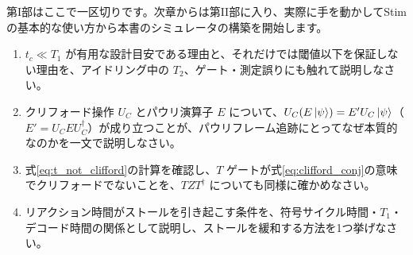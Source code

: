 第I部はここで一区切りです。次章からは第II部に入り、実際に手を動かしてStimの基本的な使い方から本書のシミュレータの構築を開始します。

\begin{exercise}
  \begin{enumerate}
    \item $t_c\ll T_1$ が有用な設計目安である理由と、それだけでは閾値以下を保証しない理由を、アイドリング中の $T_2$、ゲート・測定誤りにも触れて説明しなさい。
    \item クリフォード操作 $U_C$ とパウリ演算子 $E$ について、$U_C(E\ket\psi) = E' U_C \ket\psi$（$E'=U_CEU_C^\dagger$）が成り立つことが、パウリフレーム追跡にとってなぜ本質的なのかを一文で説明しなさい。
    \item 式\eqref{eq:t_not_clifford}の計算を確認し、$T$ ゲートが式\eqref{eq:clifford_conj}の意味でクリフォードでないことを、$TZT^\dagger$ についても同様に確かめなさい。
    \item リアクション時間がストールを引き起こす条件を、符号サイクル時間・$T_1$・デコード時間の関係として説明し、ストールを緩和する方法を1つ挙げなさい。
  \end{enumerate}
\end{exercise}
